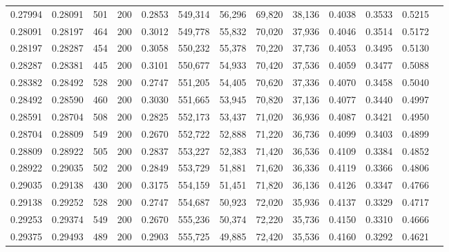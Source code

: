 \begin{tabular}{rrrrrrrrrrrrr}
0.27994 & 0.28091 &    501 & 200 &                                     0.2853 & 549,314 &  56,296 &  69,820 &  38,136 & 0.4038 & 0.3533 & 0.5215 \\
0.28091 & 0.28197 &    464 & 200 &                                     0.3012 & 549,778 &  55,832 &  70,020 &  37,936 & 0.4046 & 0.3514 & 0.5172 \\
0.28197 & 0.28287 &    454 & 200 &                                     0.3058 & 550,232 &  55,378 &  70,220 &  37,736 & 0.4053 & 0.3495 & 0.5130 \\
0.28287 & 0.28381 &    445 & 200 &                                     0.3101 & 550,677 &  54,933 &  70,420 &  37,536 & 0.4059 & 0.3477 & 0.5088 \\
0.28382 & 0.28492 &    528 & 200 &                                     0.2747 & 551,205 &  54,405 &  70,620 &  37,336 & 0.4070 & 0.3458 & 0.5040 \\
0.28492 & 0.28590 &    460 & 200 &                                     0.3030 & 551,665 &  53,945 &  70,820 &  37,136 & 0.4077 & 0.3440 & 0.4997 \\
0.28591 & 0.28704 &    508 & 200 &                                     0.2825 & 552,173 &  53,437 &  71,020 &  36,936 & 0.4087 & 0.3421 & 0.4950 \\
0.28704 & 0.28809 &    549 & 200 &                                     0.2670 & 552,722 &  52,888 &  71,220 &  36,736 & 0.4099 & 0.3403 & 0.4899 \\
0.28809 & 0.28922 &    505 & 200 &                                     0.2837 & 553,227 &  52,383 &  71,420 &  36,536 & 0.4109 & 0.3384 & 0.4852 \\
0.28922 & 0.29035 &    502 & 200 &                                     0.2849 & 553,729 &  51,881 &  71,620 &  36,336 & 0.4119 & 0.3366 & 0.4806 \\
0.29035 & 0.29138 &    430 & 200 &                                     0.3175 & 554,159 &  51,451 &  71,820 &  36,136 & 0.4126 & 0.3347 & 0.4766 \\
0.29138 & 0.29252 &    528 & 200 &                                     0.2747 & 554,687 &  50,923 &  72,020 &  35,936 & 0.4137 & 0.3329 & 0.4717 \\
0.29253 & 0.29374 &    549 & 200 &                                     0.2670 & 555,236 &  50,374 &  72,220 &  35,736 & 0.4150 & 0.3310 & 0.4666 \\
0.29375 & 0.29493 &    489 & 200 &                                     0.2903 & 555,725 &  49,885 &  72,420 &  35,536 & 0.4160 & 0.3292 & 0.4621 \\

\end{tabular}
